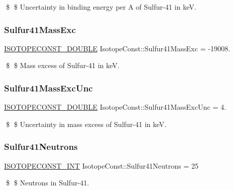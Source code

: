 \$ \$ Uncertainty in binding energy per A of Sulfur-\/41 in keV. \mbox{\label{group___isotope_const-_sulfur-_s41_gadb4bc2e057d60a372e3c3f094db99c5a}} 
\subsubsection{\texorpdfstring{Sulfur41\+Mass\+Exc}{Sulfur41MassExc}}
{\footnotesize\ttfamily \mbox{\hyperlink{group___isotope_const-_macros_ga8f45a7272ce02c0b4c65c44636ed719a}{I\+S\+O\+T\+O\+P\+E\+C\+O\+N\+S\+T\+\_\+\+D\+O\+U\+B\+LE}} Isotope\+Const\+::\+Sulfur41\+Mass\+Exc = -\/19008.}

\$ \$ Mass excess of Sulfur-\/41 in keV. \mbox{\label{group___isotope_const-_sulfur-_s41_ga052631b7533b4194d71554885c462443}} 
\subsubsection{\texorpdfstring{Sulfur41\+Mass\+Exc\+Unc}{Sulfur41MassExcUnc}}
{\footnotesize\ttfamily \mbox{\hyperlink{group___isotope_const-_macros_ga8f45a7272ce02c0b4c65c44636ed719a}{I\+S\+O\+T\+O\+P\+E\+C\+O\+N\+S\+T\+\_\+\+D\+O\+U\+B\+LE}} Isotope\+Const\+::\+Sulfur41\+Mass\+Exc\+Unc = 4.}

\$ \$ Uncertainty in mass excess of Sulfur-\/41 in keV. \mbox{\label{group___isotope_const-_sulfur-_s41_gae5d696203995181c92c7dae4938d9af2}} 
\subsubsection{\texorpdfstring{Sulfur41\+Neutrons}{Sulfur41Neutrons}}
{\footnotesize\ttfamily \mbox{\hyperlink{group___isotope_const-_macros_ga5f18360b3e99483a35c32d789e62621c}{I\+S\+O\+T\+O\+P\+E\+C\+O\+N\+S\+T\+\_\+\+I\+NT}} Isotope\+Const\+::\+Sulfur41\+Neutrons = 25}

\$ \$ Neutrons in Sulfur-\/41. \mbox{\label{group___isotope_const-_sulfur-_s41_ga4f26bdd9dee8cb2270e55e1d543e63ca}} 
